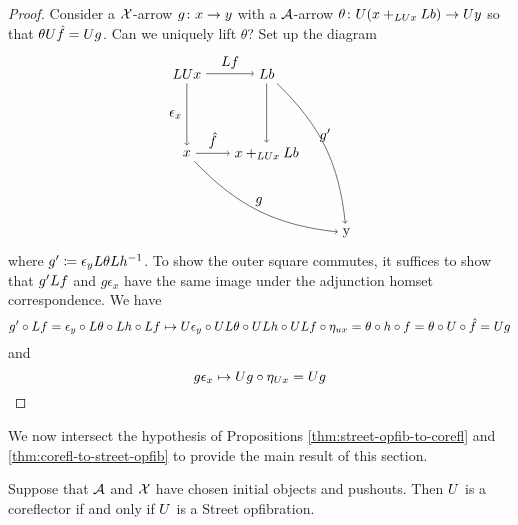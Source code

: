 \documentclass{amsart}
\begin{document}
\begin{proof}
  Consider a $ \mathcal{X} $-arrow $ g \colon x \to y $
  with a $ \mathcal{A} $-arrow
  $ \theta \colon U( x +_{LU x} L b ) \to U y $ so
  that $ \theta U \hat{f} = U g $.  Can we
  uniquely lift $ \theta $? Set up the diagram
  \[
    \begin{tikzpicture}
      \node (ul) at (0,2) {$ \L\U x $};
      \node (ll) at (0,0) {$ x $};
      \node (ur) at (2,2) {$ \L b $};
      \node (lr) at (2,0) {$ x +_{\L\U x} \L b$};
      \node (comp) at (4,-2) {y};
      \draw [->] (ul) to node [left] {$ \epsilon_x $} (ll);
      \draw [->] (ul) to node [above] {$ \L f $} (ur);
      \draw [->] (ll) to node [above] {$ \hat{f} $} (lr);
      \draw [->] (ur) to (lr);
      \draw [->] (ll) to [bend right=20] node [above] {$ g $} (comp);
      \draw [->] (ur) to [bend left=20] node [above] {$ g' $} (comp);
    \end{tikzpicture}
  \] 
  where $ g' \coloneqq \epsilon_y L\theta L h^{-1} $.
  To show the outer square commutes, it suffices
  to show that $ g' L f $ and $ g \epsilon_x $
  have the same image under the adjunction homset
  correspondence.  We have
  \[
    g' \circ L f =
    \epsilon_y \circ L\theta \circ L h \circ L f
    \mapsto
    U\epsilon_y \circ UL\theta \circ UL h
      \circ UL f \circ\eta_{ux}
    = \theta \circ h \circ f   
    = \theta \circ U \circ \hat{f} 
    = U g
  \]
  and 
  \[
    g \epsilon_x
    \mapsto
    U g \circ \eta_{U x}
    = U g
  \]
\end{proof}

We now intersect the hypothesis of Propositions
\cref{thm:street-opfib-to-corefl} and
\cref{thm:corefl-to-street-opfib} to provide the
main result of this section.

\begin{thm}
  \label{thm:main-theorem-street-version}
  Suppose that $ \mathcal{A} $ and $ \mathcal{X} $ have chosen
  initial objects and pushouts. Then $ U $ is a
  coreflector if and only if $ U $ is a Street
  opfibration.  
\end{thm}
\end{document}
